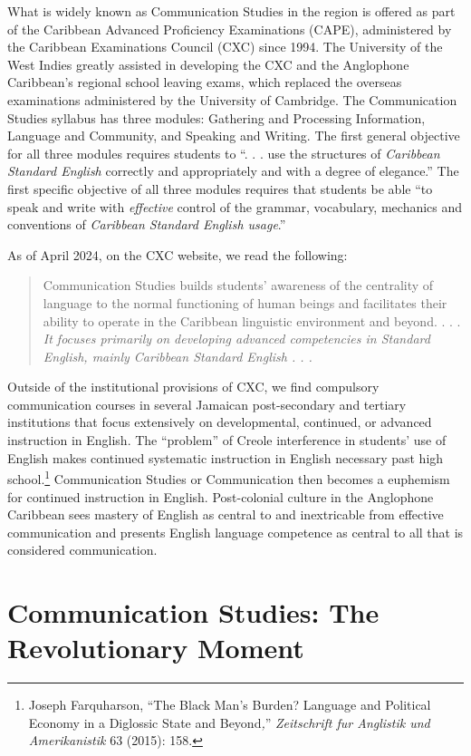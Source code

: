 \documentclass{tufte-handout}
\begin{document}
What is widely known as Communication Studies in the region is offered
as part of the Caribbean Advanced Proficiency Examinations (CAPE),
administered by the Caribbean Examinations Council (CXC) since 1994. The
University of the West Indies greatly assisted in developing the CXC and
the Anglophone Caribbean's regional school leaving exams, which replaced
the overseas examinations administered by the University of Cambridge.
The Communication Studies syllabus has three modules: Gathering and
Processing Information, Language and Community, and Speaking and
Writing. The first general objective for all three modules requires
students to ``. . . use the structures of \emph{Caribbean Standard
English} correctly and appropriately and with a degree of elegance.''
The first specific objective of all three modules requires that students
be able ``to speak and write with \emph{effective} control of the
grammar, vocabulary, mechanics and conventions of \emph{Caribbean
Standard English usage}.''

As of April 2024, on the CXC website, we read the following:

\begin{quote}
Communication Studies builds students' awareness of the centrality of
language to the normal functioning of human beings and facilitates their
ability to operate in the Caribbean linguistic environment and beyond. .
. . \emph{It focuses primarily on developing advanced competencies in
Standard English, mainly Caribbean Standard English . . .}
\end{quote}

\noindent Outside of the institutional provisions of CXC, we find compulsory
communication courses in several Jamaican post-secondary and tertiary
institutions that focus extensively on developmental, continued, or
advanced instruction in English. The ``problem'' of Creole interference
in students' use of English makes continued systematic instruction in
English necessary past high school.\footnote{Joseph Farquharson, ``The
  Black Man's Burden? Language and Political Economy in a Diglossic
  State and Beyond\emph{,}'' \emph{Zeitschrift fur Anglistik und
  Amerikanistik} 63 (2015): 158.} Communication Studies or Communication
then becomes a euphemism for continued instruction in English.
Post-colonial culture in the Anglophone Caribbean sees mastery of
English as central to and inextricable from effective communication and
presents English language competence as central to all that is
considered communication.

\hypertarget{communication-studies-the-revolutionary-moment}{%
\section{Communication Studies: The Revolutionary
Moment}\label{communication-studies-the-revolutionary-moment}}
\end{document}
